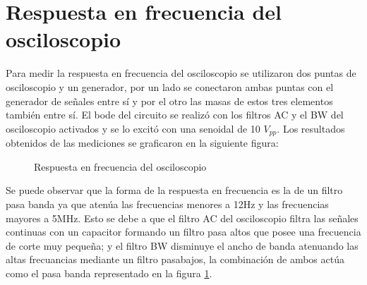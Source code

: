 \section{Respuesta en frecuencia del osciloscopio}

Para medir la respuesta en frecuencia del osciloscopio se utilizaron
dos puntas de osciloscopio y un generador, por un lado se conectaron
ambas puntas con el generador de señales entre sí y por el otro las
masas de estos tres elementos también entre sí. El bode del circuito
se realizó con los filtros AC y el BW del osciloscopio activados y
se lo excitó con una senoidal de 10 $V_{pp}$. Los resultados obtenidos
de las mediciones se graficaron en la siguiente figura:
\begin{figure}[H]
\caption{Respuesta en frecuencia del osciloscopio}
\label{rtaosc}
\end{figure}

Se puede observar que la forma de la respuesta en frecuencia es la
de un filtro pasa banda ya que atenúa las frecuencias menores a 12Hz
y las frecuencias mayores a 5MHz. Esto se debe a que el filtro AC
del osciloscopio filtra las señales continuas con un capacitor formando
un filtro pasa altos que posee una frecuencia de corte muy pequeña; y el
filtro BW disminuye el ancho de banda atenuando las altas frecuancias
mediante un filtro pasabajos, la combinación de ambos actúa como
el pasa banda representado en la figura \ref{rtaosc}.

